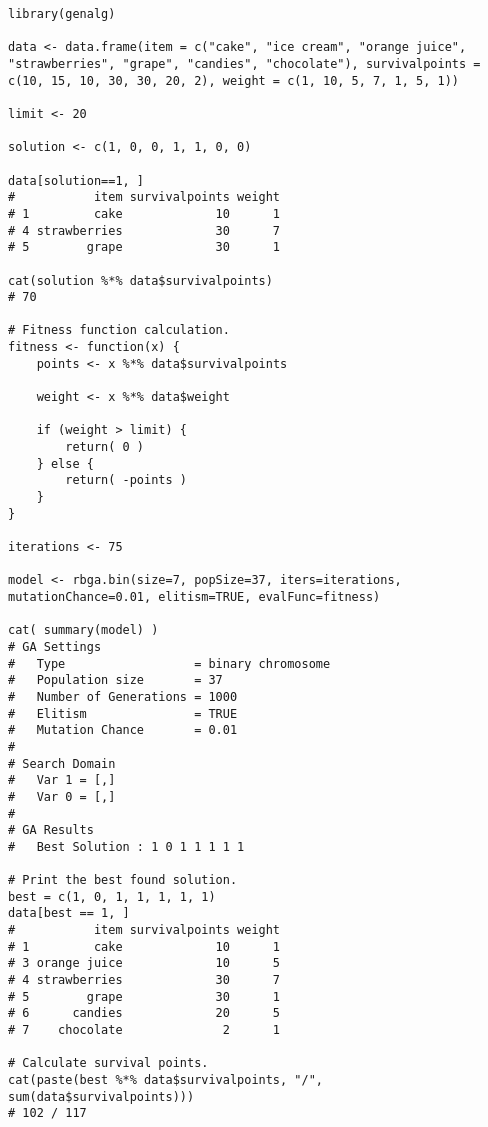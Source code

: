 \begin{lstlisting}[caption=Оптимизация на задачата за раницата с генетични алгоритми, label=listing0176]
library(genalg)

data <- data.frame(item = c("cake", "ice cream", "orange juice", "strawberries", "grape", "candies", "chocolate"), survivalpoints = c(10, 15, 10, 30, 30, 20, 2), weight = c(1, 10, 5, 7, 1, 5, 1))

limit <- 20

solution <- c(1, 0, 0, 1, 1, 0, 0)

data[solution==1, ]
#           item survivalpoints weight
# 1         cake             10      1
# 4 strawberries             30      7
# 5        grape             30      1

cat(solution %*% data$survivalpoints)
# 70

# Fitness function calculation.
fitness <- function(x) {
	points <- x %*% data$survivalpoints

	weight <- x %*% data$weight

	if (weight > limit) {
		return( 0 )
	} else {
		return( -points )
	}
}

iterations <- 75

model <- rbga.bin(size=7, popSize=37, iters=iterations, mutationChance=0.01, elitism=TRUE, evalFunc=fitness)

cat( summary(model) )
# GA Settings
#   Type                  = binary chromosome
#   Population size       = 37
#   Number of Generations = 1000
#   Elitism               = TRUE
#   Mutation Chance       = 0.01
# 
# Search Domain
#   Var 1 = [,]
#   Var 0 = [,]
# 
# GA Results
#   Best Solution : 1 0 1 1 1 1 1 

# Print the best found solution.
best = c(1, 0, 1, 1, 1, 1, 1)
data[best == 1, ]
#           item survivalpoints weight
# 1         cake             10      1
# 3 orange juice             10      5
# 4 strawberries             30      7
# 5        grape             30      1
# 6      candies             20      5
# 7    chocolate              2      1

# Calculate survival points.
cat(paste(best %*% data$survivalpoints, "/", sum(data$survivalpoints)))
# 102 / 117
\end{lstlisting}

